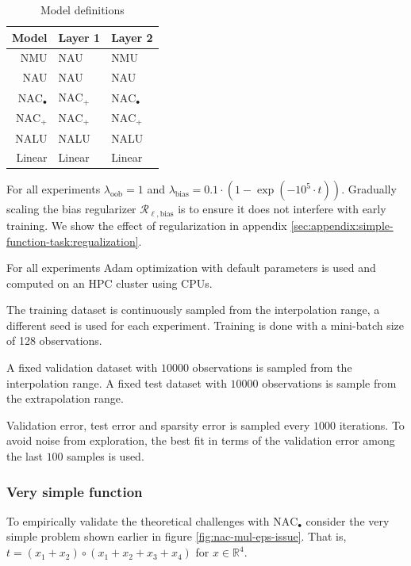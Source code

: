 \begin{table}[H]
\caption{Model definitions}
\label{tab:model-defintions}
\centering
\begin{tabular}{r l l}
\toprule
 Model & Layer 1 & Layer 2 \\
 \midrule
 NMU & NAU & NMU \\
 NAU & NAU & NAU \\
 $\mathrm{NAC}_{\bullet}$ & $\mathrm{NAC}_{+}$ & $\mathrm{NAC}_{\bullet}$ \\
 $\mathrm{NAC}_{+}$ & $\mathrm{NAC}_{+}$ & $\mathrm{NAC}_{+}$ \\
 NALU & NALU & NALU \\
 Linear & Linear & Linear \\
 \bottomrule
\end{tabular}
\end{table}

For all experiments $\lambda_{\mathrm{oob}} = 1$ and $\lambda_{\mathrm{bias}} = 0.1 \cdot (1 - \exp(-10^5 \cdot t))$. Gradually scaling the bias regularizer $\mathcal{R}_{\ell,\mathrm{bias}}$ is to ensure it does not interfere with early training. We show the effect of regularization in appendix \ref{sec:appendix:simple-function-task:regualization}.

For all experiments Adam optimization \cite{adam-optimization} with default parameters is used and computed on an HPC cluster using  CPUs.

The training dataset is continuously sampled from the interpolation range, a different seed is used for each experiment. Training is done with a mini-batch size of 128 observations.

A fixed validation dataset with $10000$ observations is sampled from the interpolation range. A fixed test dataset with $10000$ observations is sample from the extrapolation range.

Validation error, test error and sparsity error is sampled every $1000$ iterations. To avoid noise from exploration, the best fit in terms of the validation error among the last $100$ samples is used.

\subsubsection{Very simple function}

To empirically validate the theoretical challenges with $\mathrm{NAC}_{\bullet}$ consider the very simple problem shown earlier in figure \ref{fig:nac-mul-eps-issue}. That is, $t = (x_1 + x_2) \circ (x_1 + x_2 + x_3 + x_4)$ for $x \in \mathbb{R}^4$.

